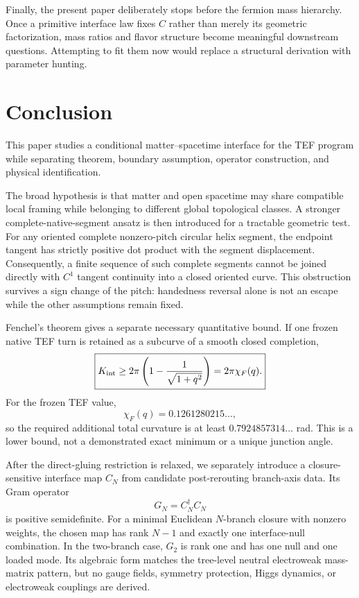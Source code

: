 \documentclass[10pt]{article}
\begin{document}
Finally, the present paper deliberately stops before the fermion mass hierarchy. Once a primitive interface law fixes $C$ rather than merely its geometric factorization, mass ratios and flavor structure become meaningful downstream questions. Attempting to fit them now would replace a structural derivation with parameter hunting.

\section{Conclusion}

This paper studies a conditional matter--spacetime interface for the TEF program while separating theorem, boundary assumption, operator construction, and physical identification.

The broad hypothesis is that matter and open spacetime may share compatible local framing while belonging to different global topological classes. A stronger complete-native-segment ansatz is then introduced for a tractable geometric test. For any oriented complete nonzero-pitch circular helix segment, the endpoint tangent has strictly positive dot product with the segment displacement. Consequently, a finite sequence of such complete segments cannot be joined directly with $C^1$ tangent continuity into a closed oriented curve. This obstruction survives a sign change of the pitch: handedness reversal alone is not an escape while the other assumptions remain fixed.

Fenchel's theorem gives a separate necessary quantitative bound. If one frozen native TEF turn is retained as a subcurve of a smooth closed completion,
\begin{equation}
\boxed{
K_{\rm int}
\ge
2\pi\left(1-\frac{1}{\sqrt{1+q^2}}\right)
=2\pi\chi_F(q).
}
\end{equation}
For the frozen TEF value,
\begin{equation}
\boxed{
\chi_F(q)=0.1261280215\ldots,
}
\end{equation}
so the required additional total curvature is at least $0.7924857314\ldots$ rad. This is a lower bound, not a demonstrated exact minimum or a unique junction angle.

After the direct-gluing restriction is relaxed, we separately introduce a closure-sensitive interface map $C_N$ from candidate post-rerouting branch-axis data. Its Gram operator
\begin{equation}
\boxed{G_N=C_N^\dagger C_N}
\end{equation}
is positive semidefinite. For a minimal Euclidean $N$-branch closure with nonzero weights, the chosen map has rank $N-1$ and exactly one interface-null combination. In the two-branch case, $G_2$ is rank one and has one null and one loaded mode. Its algebraic form matches the tree-level neutral electroweak mass-matrix pattern, but no gauge fields, symmetry protection, Higgs dynamics, or electroweak couplings are derived.
\end{document}
